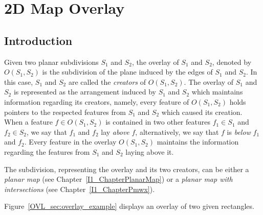 \def\Ipe#1{\def\IPEfile{#1}}

\renewcommand{\Re}{{\rm I\!\hspace{-0.025em} R}}

\def\C{{\cal C}}
\def\G{{\cal G}}
\def\F{{\cal F}}
\def\I{{\cal I}}
\def\U{{\cal U}}
\def\M{{\cal M}}
\def\eps{{\varepsilon}}
\def\bd{{\partial}}
\def\dm{{\cal D}}

\chapter{2D Map Overlay} 
\label{I1_ChapterMapOverlay_2}

\section{Introduction}
\label{OVL_sec:example}

Given two planar subdivisions $S_1$ and $S_2$, the overlay of 
$S_1$ and $S_2$, denoted by $O(S_1,S_2)$ is the subdivision 
of the plane induced by the edges of $S_1$ and $S_2$.
In this case, $S_1$ and $S_2$ are called the {\em creators} 
of $O(S_1,S_2)$. The overlay of $S_1$ and $S_2$ is represented as the 
arrangement induced by $S_1$ and $S_2$ which maintains information 
regarding its creators, namely, every feature of $O(S_1,S_2)$ holds pointers 
to the respected features from $S_1$ and $S_2$ which caused its creation.
When a feature $f \in O(S_1,S_2)$ is contained in two other features 
$f_1 \in S_1$ and $f_2 \in S_2$, we say that $f_1$ and $f_2$ 
lay {\em above} $f$, alternatively, we say that $f$ is {\em below} $f_1$ and $f_2$.
Every feature in the overlay $O(S_1, S_2)$ maintains the 
information regarding the features from $S_1$ and $S_2$ laying above it.

The subdivision, representing the overlay and its two creators, 
can be either a {\it planar map} (see Chapter~\ref{I1_ChapterPlanarMap}) 
or a {\it planar map with intersections} (see Chapter~\ref{I1_ChapterPmwx}).

Figure~\ref{OVL_sec:overlay_example} displays an overlay of two given rectangles.


